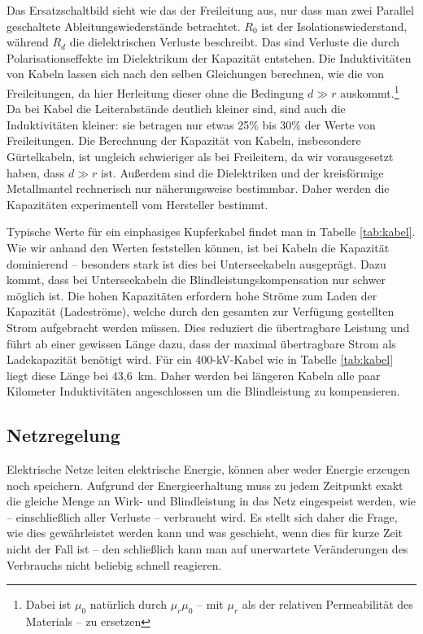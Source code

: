 Das Ersatzschaltbild sieht wie das der Freileitung aus, nur dass man zwei Parallel geschaltete Ableitungswiederstände betrachtet.
$R_0$ ist der Isolationswiederstand, während $R_d$ die dielektrischen Verluste beschreibt. Das sind Verluste die durch Polarisationseffekte im Dielektrikum der Kapazität entstehen.
Die Induktivitäten von Kabeln lassen sich nach den selben Gleichungen berechnen, wie die von Freileitungen, da hier Herleitung dieser ohne die Bedingung $d\gg r$ auskommt.\footnote{Dabei ist $\mu_0$ natürlich durch $\mu_r\mu_0$ – mit $\mu_r$ als der relativen Permeabilität des Materials – zu ersetzen} %
Da bei Kabel die Leiterabstände deutlich kleiner sind, sind auch die Induktivitäten kleiner: sie betragen nur etwas 25\% bis 30\% der Werte von Freileitungen\cite{Flosdorff}.
Die Berechnung der Kapazität von Kabeln, insbesondere Gürtelkabeln, ist ungleich schwieriger als bei Freileitern, da wir vorausgesetzt haben, dass $d\gg r$ ist. Außerdem sind die Dielektriken und der kreisförmige Metallmantel rechnerisch nur näherungsweise bestimmbar. Daher werden die Kapazitäten experimentell vom Hersteller bestimmt.\cite{Flosdorff}

Typische Werte für ein einphasiges Kupferkabel findet man in Tabelle \ref{tab:kabel}.
Wie wir anhand den Werten feststellen können, ist bei Kabeln die Kapazität dominierend --
besonders stark ist dies bei Unterseekabeln ausgeprägt. %
Dazu kommt, dass bei Unterseekabeln die Blindleistungskompensation nur schwer möglich ist.
Die hohen Kapazitäten erfordern hohe Ströme zum Laden der Kapazität (Ladeströme), welche durch den gesamten zur Verfügung gestellten Strom aufgebracht werden müssen.
Dies reduziert die übertragbare Leistung und führt ab einer gewissen Länge dazu, dass der maximal übertragbare Strom als Ladekapazität benötigt wird.
Für ein 400-kV-Kabel wie in Tabelle \ref{tab:kabel} liegt diese Länge bei 43,6\ km.
Daher werden bei längeren Kabeln alle paar Kilometer %
Induktivitäten angeschlossen um die Blindleistung zu kompensieren.

\subsection{Netzregelung}
Elektrische Netze leiten elektrische Energie, können aber weder Energie erzeugen noch speichern.
Aufgrund der Energieerhaltung muss zu jedem Zeitpunkt exakt die gleiche Menge an Wirk- und Blindleistung in das Netz eingespeist werden, wie – einschließlich aller Verluste – verbraucht wird.
Es stellt sich daher die Frage, wie dies gewährleistet werden kann und was geschieht, wenn dies für kurze Zeit nicht der Fall ist – den schließlich kann man auf unerwartete Veränderungen des Verbrauchs nicht beliebig schnell reagieren.

